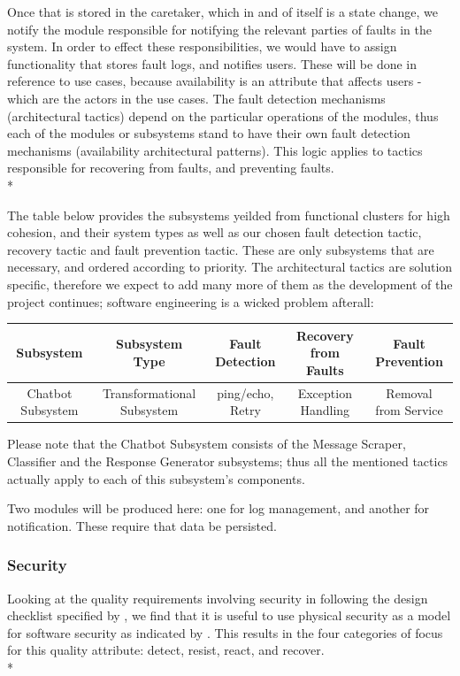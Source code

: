 \documentclass[11pt]{article}
\begin{document}
Once that is stored in the caretaker, which in and of itself is a state change, we notify the module responsible for notifying the relevant parties of faults in the system. In order to effect these responsibilities, we would have to assign functionality that stores fault logs, and notifies users. These will be done in reference to use cases, because availability is an attribute that affects users - which are the actors in the use cases. The fault detection mechanisms (architectural tactics) depend on the particular operations of the modules, thus each of the modules or subsystems stand to have their own fault detection mechanisms (availability architectural patterns). This logic applies to tactics responsible for recovering from faults, and preventing faults.\\*

The table below provides the subsystems yeilded from functional clusters for high cohesion, and their system types as well as our chosen fault detection tactic, recovery tactic and fault prevention tactic. These are only subsystems that are necessary, and ordered according to priority. The architectural tactics are solution specific, therefore we expect to add many more of them as the development of the project continues; software engineering is a wicked problem afterall:

\begin{center}
	\begin{tabular}{|c|c|c|c|c|}
		\hline
		Subsystem & Subsystem Type & Fault Detection & Recovery from Faults & Fault Prevention \\
		\hline
		Chatbot Subsystem & Transformational Subsystem & ping/echo, Retry & Exception Handling & Removal from Service\\
		\hline
	\end{tabular}	
\end{center}
Please note that the Chatbot Subsystem consists of the Message Scraper, Classifier and the Response Generator subsystems; thus all the mentioned tactics actually apply to each of this subsystem's components.

Two modules will be produced here: one for log management, and another for notification. These require that data be persisted.

\subsubsection{Security}
Looking at the quality requirements involving security in following the design checklist specified by \cite{Book:1}, we find that it is useful to use physical security as a model for software security as indicated by \cite{Book:2}. This results in the four categories of focus for this quality attribute: detect, resist, react, and recover. \\*
\end{document}

